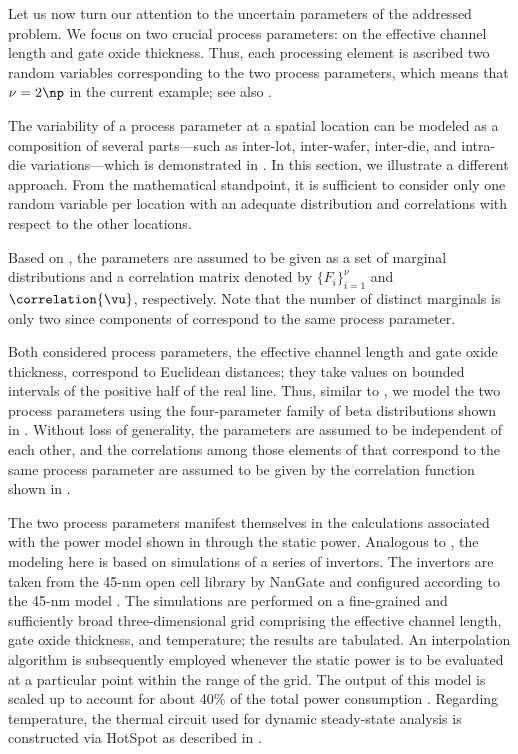 Let us now turn our attention to the uncertain parameters \vu of the addressed
problem. We focus on two crucial process parameters: on the effective channel
length and gate oxide thickness. Thus, each processing element is ascribed two
random variables corresponding to the two process parameters, which means that
$\nu = 2 \np$ in the current example; see also .

\begin{remark}
The variability of a process parameter at a spatial location can be modeled as a
composition of several parts---such as inter-lot, inter-wafer, inter-die, and
intra-die variations---which is demonstrated in
. In this section, we illustrate a different
approach. From the mathematical standpoint, it is sufficient to consider only
one random variable per location with an adequate distribution and correlations
with respect to the other locations.
\end{remark}

Based on , the parameters \vu are assumed to be given as
a set of marginal distributions and a correlation matrix denoted by $\{ F_i
\}_{i = 1}^\nu$ and $\correlation{\vu}$, respectively. Note that the number of
distinct marginals is only two since \np components of \vu correspond to the
same process parameter.

Both considered process parameters, the effective channel length and gate oxide
thickness, correspond to Euclidean distances; they take values on bounded
intervals of the positive half of the real line. Thus, similar to
, we model the two process parameters using
the four-parameter family of beta distributions shown in
. Without loss of generality, the parameters are assumed
to be independent of each other, and the correlations among those elements of
\vu that correspond to the same process parameter are assumed to be given by the
correlation function shown in .

The two process parameters manifest themselves in the calculations associated
with the power model shown in  through the static
power. Analogous to , the modeling here is
based on  simulations of a series of  invertors. The
invertors are taken from the 45-nm open cell library by NanGate \cite{nangate}
and configured according to the 45-nm   model \cite{ptm}. The
simulations are performed on a fine-grained and sufficiently broad
three-dimensional grid comprising the effective channel length, gate oxide
thickness, and temperature; the results are tabulated. An interpolation
algorithm is subsequently employed whenever the static power is to be evaluated
at a particular point within the range of the grid. The output of this model is
scaled up to account for about 40\% of the total power consumption
\cite{liu2007}. Regarding temperature, the thermal  circuit used for
dynamic steady-state analysis is constructed via HotSpot \cite{skadron2003} as
described in .

